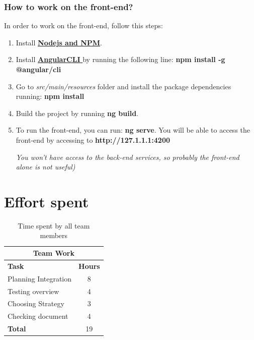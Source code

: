 \documentclass[a4paper, hidelinks, 12pt]{report}
\begin{document}
	\subsection{How to work on the front-end?}
	In order to work on the front-end, follow this steps:

	\begin{enumerate}
	\item Install \href{https://nodejs.org/es/download/}{\textbf{Nodejs and NPM}}.
	\item Install \href{https://cli.angular.io/}{\textbf{AngularCLI }} by running the following line:\textbf{ npm install -g @angular/cli }
	\item Go to \textit{src/main/resources} folder and install the package dependencies running: \textbf{npm install}
	\item Build the project by running \textbf{ng build}.
	\item To run the front-end, you can run: \textbf{ng serve}. You will be able to access the front-end by accessing to \textbf{http://127.1.1.1:4200}

	\textit{You won't have access to the back-end services, so probably the front-end alone is not useful)}
	\end{enumerate}


	\chapter{Effort spent}

	\begin{table}[h]
		\centering
		\begin{tabular}{l c}
			\hline\hline
			\multicolumn{2}{c}{\textbf{Team Work}} \\
			\hline
			\textbf{Task} & \textbf{Hours} \\ [0.5ex]
			\hline
			Planning Integration & 8  \\
			Testing overview & 4\\
			Choosing Strategy & 3\\
			Checking document  & 4  \\
			\hline
			\textbf{Total} & 19  \\
			\hline
		\end{tabular}
		\caption{Time spent by all team members}
		\label{fig:Time spent by all team members}
	\end{table}
\end{document}
